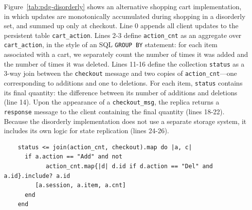 Figure~\ref{tab:pdg-disorderly} shows an alternative shopping cart implementation, in which
updates are monotonically accumulated during shopping in a disorderly set, and summed up
only at checkout.  Line 0 appends all client updates to the persistent table
\texttt{cart\_action}.  Lines 2-3 define \texttt{action\_cnt} as an aggregate
over \texttt{cart\_action}, in the style of an SQL \texttt{GROUP BY} statement: for each
item associated with a cart, we separately count the number of times it was
added and the number of times it was deleted.   Lines 11-16 define the collection
\texttt{status} as a 3-way join between the \texttt{checkout} message and two
copies of \texttt{action\_cnt}---one corresponding to additions and one to
deletions.  
For each item, \texttt{status} contains its final quantity: the
difference between its number of additions and deletions (line 14).  
Upon the appearance of a \texttt{checkout\_msg}, the
replica returns a \texttt{response} message to the client containing the
final quantity (lines 18-22).  
Because the disorderly implementation does not use a separate
storage system, it includes its own logic for state replication (lines 24-26).



\begin{scriptsize}
\begin{verbatim}
	status <= join(action_cnt, checkout).map do |a, c|
	  if a.action == "Add" and not
	        action_cnt.map{|d| d.id if d.action == "Del" and a.id}.include? a.id
	     [a.session, a.item, a.cnt]
	  end
	end
\end{verbatim}	
\end{scriptsize}

